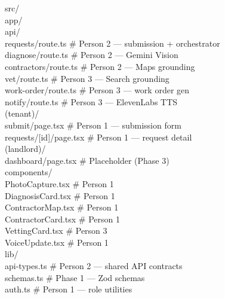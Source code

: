 \documentclass[11pt, a4paper]{article}
\begin{document}
\begin{codebox}
src/\\
\quad app/\\
\quad\quad api/\\
\quad\quad\quad requests/route.ts \quad\quad\quad\quad\# Person 2 --- submission + orchestrator\\
\quad\quad\quad diagnose/route.ts \quad\quad\quad\quad\# Person 2 --- Gemini Vision\\
\quad\quad\quad contractors/route.ts \quad\quad\quad\# Person 2 --- Maps grounding\\
\quad\quad\quad vet/route.ts \quad\quad\quad\quad\quad\quad\quad\# Person 3 --- Search grounding\\
\quad\quad\quad work-order/route.ts \quad\quad\quad\# Person 3 --- work order gen\\
\quad\quad\quad notify/route.ts \quad\quad\quad\quad\quad\# Person 3 --- ElevenLabs TTS\\
\quad\quad (tenant)/\\
\quad\quad\quad submit/page.tsx \quad\quad\quad\quad\quad\# Person 1 --- submission form\\
\quad\quad\quad requests/[id]/page.tsx \quad\# Person 1 --- request detail\\
\quad\quad (landlord)/\\
\quad\quad\quad dashboard/page.tsx \quad\quad\quad\# Placeholder (Phase 3)\\
\quad components/\\
\quad\quad PhotoCapture.tsx \quad\quad\quad\quad\quad\# Person 1\\
\quad\quad DiagnosisCard.tsx \quad\quad\quad\quad\# Person 1\\
\quad\quad ContractorMap.tsx \quad\quad\quad\quad\# Person 1\\
\quad\quad ContractorCard.tsx \quad\quad\quad\quad\# Person 1\\
\quad\quad VettingCard.tsx \quad\quad\quad\quad\quad\# Person 3\\
\quad\quad VoiceUpdate.tsx \quad\quad\quad\quad\quad\# Person 1\\
\quad lib/\\
\quad\quad api-types.ts \quad\quad\quad\quad\quad\quad\quad\# Person 2 --- shared API contracts\\
\quad\quad schemas.ts \quad\quad\quad\quad\quad\quad\quad\quad\# Phase 1 --- Zod schemas\\
\quad\quad auth.ts \quad\quad\quad\quad\quad\quad\quad\quad\quad\# Person 1 --- role utilities\\

\end{codebox}
\end{document}
